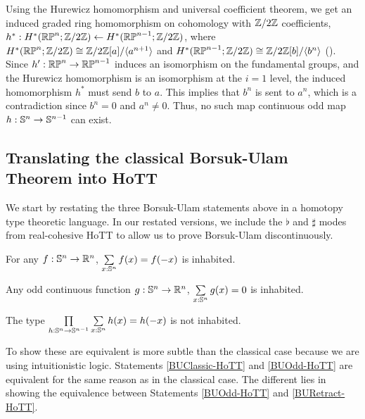 \documentclass{amsart}
\begin{document}
Using the Hurewicz homomorphism and universal coefficient theorem, we
get an induced graded ring homomorphism on cohomology with $\mathbb{Z}/2\mathbb{Z}$
coefficients,
$h^*:H^*(\mathbb{RP}^n;\mathbb{Z}/2\mathbb{Z})\leftarrow H^*(\mathbb{RP}^{n-1};\mathbb{Z}/2\mathbb{Z})$, where
$H^*(\mathbb{RP}^n;\mathbb{Z}/2\mathbb{Z})\cong \mathbb{Z}/2\mathbb{Z}[a]/\langle a^{n+1}\rangle$ and
$H^*(\mathbb{RP}^{n-1};\mathbb{Z}/2\mathbb{Z})\cong \mathbb{Z}/2\mathbb{Z}[b]/\langle b^n\rangle$
().  Since
$h':\mathbb{RP}^n\rightarrow\mathbb{RP}^{n-1}$ induces an isomorphism on the
fundamental groups, and the Hurewicz homomorphism is an isomorphism at
the $i=1$ level, the induced homomorphism $h^*$ must send $b$ to
$a$. This implies that $b^n$ is sent to $a^n$, which is a
contradiction since $b^n=0$ and $a^n\neq 0$.  Thus, no such map
continuous odd map $h:\mathbb{S}^n \rightarrow \mathbb{S}^{n-1}$ can exist.

\subsection{Translating the classical Borsuk-Ulam Theorem into HoTT}

We start by restating the three Borsuk-Ulam statements above in a
homotopy type theoretic language. In our restated versions, we include
the $\flat$ and $\sharp$ modes from real-cohesive HoTT to allow us to
prove Borsuk-Ulam discontinuously. 

\begin{statement}\label{BUClassic-HoTT}
  For any $f: \mathbb{S}^n \rightarrow \mathbb{R}^n$, $\sum\limits_{x : \mathbb{S}^n}
  f(x) = f(-x)$ is inhabited.
\end{statement}

\begin{statement}\label{BUOdd-HoTT}
  Any odd continuous function $g: \mathbb{S}^n \rightarrow \mathbb{R}^n$,
  $\sum\limits_{x : \mathbb{S}^n} g(x) = 0$ is inhabited.
\end{statement}

\begin{statement}\label{BURetract-HoTT}
  The type $\prod\limits_{h:\mathbb{S}^n \rightarrow \mathbb{S}^{n-1}}
  \sum\limits_{x : \mathbb{S}^n} h(x) = h(-x)$ is not inhabited. 
\end{statement}

To show these are equivalent is more subtle than the classical case
because we are using intuitionistic logic.  Statements
\ref{BUClassic-HoTT} and \ref{BUOdd-HoTT} are equivalent for the same
reason as in the classical case. The different lies in showing the
equivalence between Statements \ref{BUOdd-HoTT} and
\ref{BURetract-HoTT}.
\end{document}
